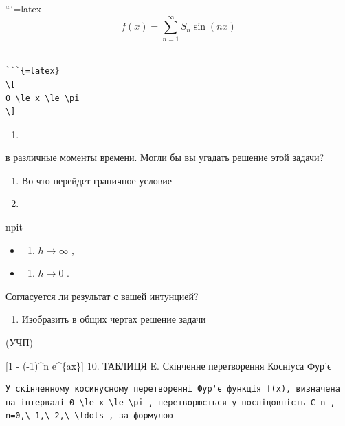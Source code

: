 \documentclass[
  ukrainian,
]{article}
\providecommand{\tightlist}{%
  \setlength{\itemsep}{0pt}\setlength{\parskip}{0pt}}
\begin{document}
```{=latex}
\[
f(x) = \sum_{n=1}^{\infty} S_n \sin(nx)
\]

\begin{verbatim}

```{=latex}
\[
0 \le x \le \pi
\]
\end{verbatim}

\begin{enumerate}
\def\labelenumi{\arabic{enumi}.}
\tightlist
\item
\end{enumerate}

в различные моменты времени. Могли бы вы угадать решение этой задачи?

\begin{enumerate}
\def\labelenumi{\arabic{enumi}.}
\setcounter{enumi}{2}
\item
  Во что перейдет граничное условие
\item
\end{enumerate}

npit

\begin{itemize}
\tightlist
\item
  \begin{enumerate}
  \def\labelenumi{\alph{enumi})}
  \tightlist
  \item
    \(h \rightarrow \infty\) ,
  \end{enumerate}
\item
  \begin{enumerate}
  \def\labelenumi{\arabic{enumi})}
  \setcounter{enumi}{5}
  \tightlist
  \item
    \(h \rightarrow 0\) .
  \end{enumerate}
\end{itemize}

Согласуется ли результат с вашей интунцией?

\begin{enumerate}
\def\labelenumi{\arabic{enumi}.}
\setcounter{enumi}{3}
\tightlist
\item
  Изобразить в общих чертах решение задачи
\end{enumerate}

(УЧП)

 {[}1 - (-1)\^{}n e\^{}\{ax\}{]} 10.
  ТАБЛИЦЯ E.
Скінченне перетворення Косніуса Фур'є

\begin{verbatim}
У скінченному косинусному перетворенні Фур'є функція f(x), визначена на інтервалі 0 \le x \le \pi , перетворюється у послідовність C_n , n=0,\ 1,\ 2,\ \ldots , за формулою
\end{verbatim}
\end{document}
